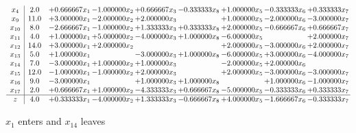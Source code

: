 \documentclass[10pt]{article}
\begin{document}
 \[\begin{array}{c| c c@{\hskip 2pt} c@{\hskip 2pt} c@{\hskip 2pt} c@{\hskip 2pt} c@{\hskip 2pt} c@{\hskip 2pt} c@{\hskip 2pt} }
 x_{4}   &  2.0 & + 0.666667 x_{1} & -1.000000 x_{2} & + 0.666667 x_{3} & -0.333333 x_{8} & + 1.000000 x_{5} & -0.333333 x_{6} & + 0.333333 x_{7}\\
 x_{9}   &  11.0 & + 3.000000 x_{1} & -2.000000 x_{2} & + 2.000000 x_{3} &   & + 1.000000 x_{5} & -2.000000 x_{6} & -3.000000 x_{7}\\
 x_{10}   &  8.0 & -2.666667 x_{1} & -1.000000 x_{2} & + 1.333333 x_{3} & + 0.333333 x_{8} & + 2.000000 x_{5} & -0.666667 x_{6} & + 0.666667 x_{7}\\
 x_{11}   &  4.0 & + 1.000000 x_{1} & + 5.000000 x_{2} & -4.000000 x_{3} & + 1.000000 x_{8} & -6.000000 x_{5} &   & + 2.000000 x_{7}\\
 x_{12}   &  14.0 & + 3.000000 x_{1} & + 2.000000 x_{2} &    &   & + 2.000000 x_{5} & -3.000000 x_{6} & + 2.000000 x_{7}\\
 x_{13}   &  5.0 & + 1.000000 x_{1} &   & -3.000000 x_{3} & + 1.000000 x_{8} & -6.000000 x_{5} & + 3.000000 x_{6} & -4.000000 x_{7}\\
 x_{14}   &  7.0 & -3.000000 x_{1} & + 1.000000 x_{2} & + 1.000000 x_{3} &   & -2.000000 x_{5} & + 2.000000 x_{6} &   \\
 x_{15}   &  12.0 & -1.000000 x_{1} & -1.000000 x_{2} & + 2.000000 x_{3} &   & + 2.000000 x_{5} & -3.000000 x_{6} & -3.000000 x_{7}\\
 x_{16}   &  9.0 & -3.000000 x_{1} &   & + 1.000000 x_{3} & + 1.000000 x_{8} &   & + 1.000000 x_{6} & -1.000000 x_{7}\\
 x_{17}   &  2.0 & + 0.666667 x_{1} & + 1.000000 x_{2} & -4.333333 x_{3} & + 0.666667 x_{8} & -5.000000 x_{5} & -0.333333 x_{6} & + 0.333333 x_{7}\\
\hline
z    &  4.0 & + 0.333333 x_{1} & -4.000000 x_{2} & + 1.333333 x_{3} & -0.666667 x_{8} & + 4.000000 x_{5} & -1.666667 x_{6} & -0.333333 x_{7}\\
\end{array}\]


 $ x_{1} $ enters and $ x_{14} $ leaves 
\end{document}
